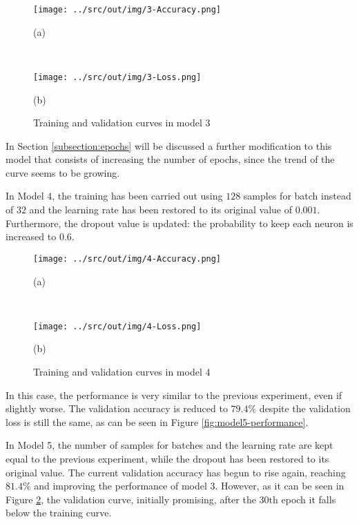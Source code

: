 \documentclass[a4paper,12pt]{article} %
\begin{document}
	\begin{figure}[htb]
		\begin{minipage}[c]{.49\textwidth}
			\centering
			\texttt{[image: ../src/out/img/3-Accuracy.png]}
			\caption*{(a)}
		\end{minipage}
		~
		\begin{minipage}[c]{.49\textwidth}
			\centering
			\texttt{[image: ../src/out/img/3-Loss.png]}
			\caption*{(b)}
		\end{minipage}
		\caption{Training and validation curves in model 3}
		\label{fig:model3-performance}
	\end{figure}
		
	In Section \ref{subsection:epochs} will be discussed a further 
	modification to this model that consists of increasing the number of 
	epochs, since the trend of the curve seems to be growing.
	\newline 
	
	In Model 4, the training has been carried out using $128$ samples 
	for batch instead of $32$ and the learning rate has been restored to its 
	original value of $0.001$. 
	Furthermore, the dropout value is updated: the probability to keep each 
	neuron is increased to $0.6$. 
		
	\begin{figure}[htb]
		\begin{minipage}[c]{.49\textwidth}
			\centering
			\texttt{[image: ../src/out/img/4-Accuracy.png]}
			\caption*{(a)}
		\end{minipage}
		~
		\begin{minipage}[c]{.49\textwidth}
			\centering
			\texttt{[image: ../src/out/img/4-Loss.png]}
			\caption*{(b)}
		\end{minipage}
		\caption{Training and validation curves in model 4}
		\label{fig:model4-performance}
	\end{figure}

	In this case, the performance is very similar to the previous experiment, 
	even if slightly worse. The validation accuracy is reduced to 
	$79.4\%$ despite the validation loss is still the same, as can be seen in 
	Figure \ref*{fig:model5-performance}.
	\newline
	
	In Model 5, the number of samples for batches and the learning rate are 
	kept 
	equal to the previous experiment, while the dropout has been restored to 
	its original value. 
	The current validation accuracy has begun to rise again, reaching $81.4\%$ 
	and improving the performance of model 3. However, as it can be seen in 
	Figure \ref{fig:model4-performance}, the validation curve, initially 
	promising, after the $30\mathrm{th}$ epoch it falls below the training 
	curve.
\end{document}
